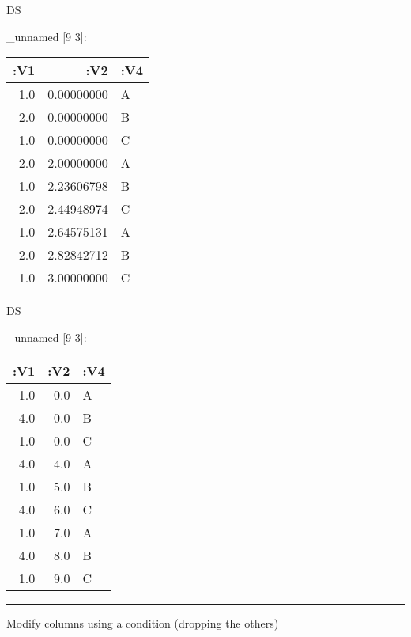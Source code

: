 \documentclass[]{article}
\newenvironment{Shaded}{\begin{snugshade}}{\end{snugshade}}
\newcommand{\KeywordTok}[1]{\textcolor[rgb]{0.13,0.29,0.53}{\textbf{#1}}}
\newcommand{\DecValTok}[1]{\textcolor[rgb]{0.00,0.00,0.81}{#1}}
\newcommand{\FunctionTok}[1]{\textcolor[rgb]{0.00,0.00,0.00}{#1}}
\newcommand{\VariableTok}[1]{\textcolor[rgb]{0.00,0.00,0.00}{#1}}
\newcommand{\BuiltInTok}[1]{#1}
\newcommand{\AttributeTok}[1]{\textcolor[rgb]{0.77,0.63,0.00}{#1}}
\newcommand{\NormalTok}[1]{#1}
\begin{document}
\begin{Shaded}
\begin{Highlighting}[]
\NormalTok{DS}
\end{Highlighting}
\end{Shaded}

\_unnamed {[}9 3{]}:

\begin{longtable}[]{@{}rrl@{}}
\toprule
:V1 & :V2 & :V4\tabularnewline
\midrule
\endhead
1.0 & 0.00000000 & A\tabularnewline
2.0 & 0.00000000 & B\tabularnewline
1.0 & 0.00000000 & C\tabularnewline
2.0 & 2.00000000 & A\tabularnewline
1.0 & 2.23606798 & B\tabularnewline
2.0 & 2.44948974 & C\tabularnewline
1.0 & 2.64575131 & A\tabularnewline
2.0 & 2.82842712 & B\tabularnewline
1.0 & 3.00000000 & C\tabularnewline
\bottomrule
\end{longtable}

\begin{Shaded}
\end{Shaded}

\begin{Shaded}
\begin{Highlighting}[]
\NormalTok{DS}
\end{Highlighting}
\end{Shaded}

\_unnamed {[}9 3{]}:

\begin{longtable}[]{@{}rrl@{}}
\toprule
:V1 & :V2 & :V4\tabularnewline
\midrule
\endhead
1.0 & 0.0 & A\tabularnewline
4.0 & 0.0 & B\tabularnewline
1.0 & 0.0 & C\tabularnewline
4.0 & 4.0 & A\tabularnewline
1.0 & 5.0 & B\tabularnewline
4.0 & 6.0 & C\tabularnewline
1.0 & 7.0 & A\tabularnewline
4.0 & 8.0 & B\tabularnewline
1.0 & 9.0 & C\tabularnewline
\bottomrule
\end{longtable}

\begin{center}\rule{0.5\linewidth}{0.5pt}\end{center}

Modify columns using a condition (dropping the others)

\begin{Shaded}
\end{Shaded}
\end{document}
